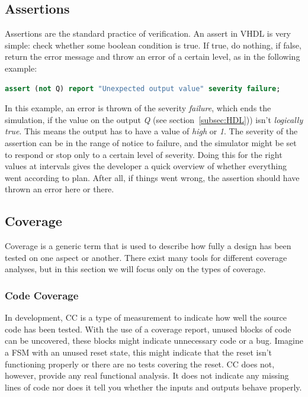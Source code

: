 \documentclass[11pt,british]{article}
\begin{document}
\subsection{Assertions}
\label{subsec:assertions}
Assertions are the standard practice of verification. An assert in VHDL is very simple: check whether some boolean condition is true. If true, do nothing, if false, return the error message and throw an error of a certain level, as in the following example:
\begin{lstlisting}[language=VHDL, tabsize=4, frame=single, framesep=2mm, belowskip=8pt, aboveskip=8pt, showstringspaces=false]
assert (not Q) report "Unexpected output value" severity failure;
\end{lstlisting}
In this example, an error is thrown of the severity \emph{failure}, which ends the simulation, if the value on the output \emph{Q} (see section~\ref{subsec:HDL})) isn't \emph{logically true}. This means the output has to have a value of \emph{high} or \emph{1}. The severity of the assertion can be in the range of notice to failure, and the simulator might be set to respond or stop only to a certain level of severity. Doing this for the right values at intervals gives the developer a quick overview of whether everything went according to plan. After all, if things went wrong, the assertion should have thrown an error here or there.

\subsection{Coverage}
Coverage is a generic term that is used to describe how fully a design has been tested on one aspect or another. There exist many tools for different coverage analyses, but in this section we will focus only on the types of coverage.

\subsubsection{Code Coverage}
In development, \gls{CC} is a type of measurement to indicate how well the source code has been tested. With the use of a coverage report, unused blocks of code can be uncovered, these blocks might indicate unnecessary code or a bug. Imagine a \gls{FSM} with an unused reset state, this might indicate that the reset isn't functioning properly or there are no tests covering the reset. CC does not, however, provide any real functional analysis. It does not indicate any missing lines of code nor does it tell you whether the inputs and outputs behave properly.
\end{document}
